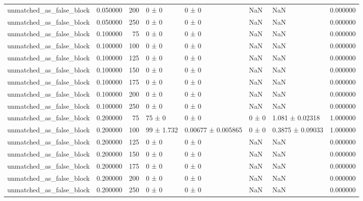 \begin{tabular}{lrrllllr}
unmatched_as_false_block & 0.050000 & 200 & 0 ± 0 & 0 ± 0 & NaN & NaN & 0.000000 \\
unmatched_as_false_block & 0.050000 & 250 & 0 ± 0 & 0 ± 0 & NaN & NaN & 0.000000 \\
unmatched_as_false_block & 0.100000 & 75 & 0 ± 0 & 0 ± 0 & NaN & NaN & 0.000000 \\
unmatched_as_false_block & 0.100000 & 100 & 0 ± 0 & 0 ± 0 & NaN & NaN & 0.000000 \\
unmatched_as_false_block & 0.100000 & 125 & 0 ± 0 & 0 ± 0 & NaN & NaN & 0.000000 \\
unmatched_as_false_block & 0.100000 & 150 & 0 ± 0 & 0 ± 0 & NaN & NaN & 0.000000 \\
unmatched_as_false_block & 0.100000 & 175 & 0 ± 0 & 0 ± 0 & NaN & NaN & 0.000000 \\
unmatched_as_false_block & 0.100000 & 200 & 0 ± 0 & 0 ± 0 & NaN & NaN & 0.000000 \\
unmatched_as_false_block & 0.100000 & 250 & 0 ± 0 & 0 ± 0 & NaN & NaN & 0.000000 \\
unmatched_as_false_block & 0.200000 & 75 & 75 ± 0 & 0 ± 0 & 0 ± 0 & 1.081 ± 0.02318 & 1.000000 \\
unmatched_as_false_block & 0.200000 & 100 & 99 ± 1.732 & 0.00677 ± 0.005865 & 0 ± 0 & 0.3875 ± 0.09033 & 1.000000 \\
unmatched_as_false_block & 0.200000 & 125 & 0 ± 0 & 0 ± 0 & NaN & NaN & 0.000000 \\
unmatched_as_false_block & 0.200000 & 150 & 0 ± 0 & 0 ± 0 & NaN & NaN & 0.000000 \\
unmatched_as_false_block & 0.200000 & 175 & 0 ± 0 & 0 ± 0 & NaN & NaN & 0.000000 \\
unmatched_as_false_block & 0.200000 & 200 & 0 ± 0 & 0 ± 0 & NaN & NaN & 0.000000 \\
unmatched_as_false_block & 0.200000 & 250 & 0 ± 0 & 0 ± 0 & NaN & NaN & 0.000000 \\
\bottomrule
\end{tabular}

